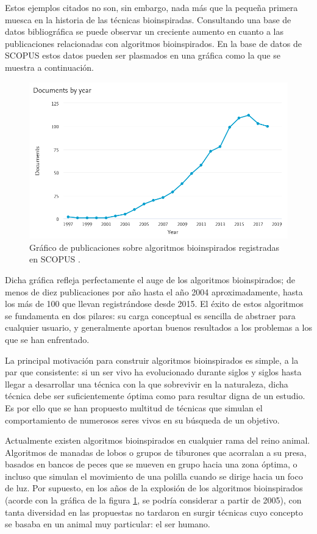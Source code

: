 Estos ejemplos citados no son, sin embargo, nada más que la pequeña primera muesca en la historia de las técnicas bioinspiradas. Consultando una base de datos bibliográfica se puede observar un creciente aumento en cuanto a las publicaciones relacionadas con algoritmos bioinspirados. En la base de datos de SCOPUS estos datos pueden ser plasmados en una gráfica como la que se muestra a continuación.

\begin{figure}[h]
	\centering
	\includegraphics[scale=0.4]{imagenes/scopus-grafico-bioinspirados.png}
	\caption{Gráfico de publicaciones sobre algoritmos bioinspirados registradas en SCOPUS \cite{scopus-bioinspired}.}
	\label{grafica-scopus}
\end{figure}

Dicha gráfica refleja perfectamente el auge de los algoritmos bioinspirados; de menos de diez publicaciones por año hasta el año 2004 aproximadamente, hasta los más de 100 que llevan registrándose desde 2015. El éxito de estos algoritmos se fundamenta en dos pilares: su carga conceptual es sencilla de abstraer para cualquier usuario, y generalmente aportan buenos resultados a los problemas a los que se han enfrentado.

La principal motivación para construir algoritmos bioinspirados es simple, a la par que consistente: si un ser vivo ha evolucionado durante siglos y siglos hasta llegar a desarrollar una técnica con la que sobrevivir en la naturaleza, dicha técnica debe ser suficientemente óptima como para resultar digna de un estudio. Es por ello que se han propuesto multitud de técnicas que simulan el comportamiento de numerosos seres vivos en su búsqueda de un objetivo.

Actualmente existen algoritmos bioinspirados en cualquier rama del reino animal. Algoritmos de manadas de lobos o grupos de tiburones que acorralan a su presa, basados en bancos de peces que se mueven en grupo hacia una zona óptima, o incluso que simulan el movimiento de una polilla cuando se dirige hacia un foco de luz. Por supuesto, en los años de la explosión de los algoritmos bioinspirados (acorde con la gráfica de la figura \ref{grafica-scopus}, se podría considerar a partir de 2005), con tanta diversidad en las propuestas no tardaron en surgir técnicas cuyo concepto se basaba en un animal muy particular: el ser humano.

